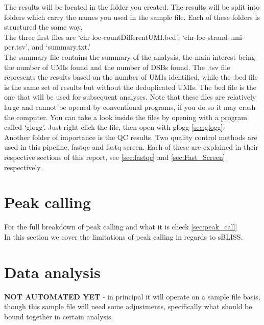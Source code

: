 The results will be located in the folder you created. The results will be split into folders which carry the names you used in the sample file. Each of these folders is structured the same way.\\
The three first files are `chr-loc-countDifferentUMI.bed', `chr-loc-strand-umi-pcr.tsv', and `summary.txt.'\\
The summary file contains the summary of the analysis, the main interest being the number of UMIs found and the number of DSBs found. The .tsv file represents the results based on the number of UMIs identified, while the .bed file is the same set of results but without the deduplicated UMIs. The bed file is the one that will be used for subsequent analyses. Note that these files are relatively large and cannot be opened by conventional programs, if you do so it may crash the computer. You can take a look inside the files by opening with a program called `glogg'. Just right-click the file, then open with glogg \autoref{sec:glogg}.\\
Another folder of importance is the QC results. Two quality control methods are used in this pipeline, fastqc and fastq screen. Each of these are explained in their respective sections of this report, see \autoref{sec:fastqc} and \autoref{sec:Fast_Screen} respectively.

\section{Peak calling \label{sec:bliss_peak_calling}}
For the full breakdown of peak calling and what it is check \autoref{sec:peak_call}\\
In this section we cover the limitations of peak calling in regards to sBLISS.

\section{Data analysis \label{sec:sBLISS_dta_analysis}}
\textbf{NOT AUTOMATED YET} - in principal it will operate on a sample file basis, though this sample file will need some adjustments, specifically what should be bound together in certain analysis. 
